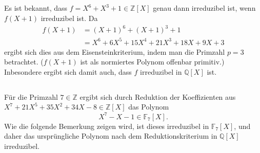 \documentclass[a4paper,10pt]{article}
\theoremstyle{definition}
\newcommand{\Z}{\mathbb{Z}}
\newcommand{\Q}{\mathbb{Q}}
\newcommand{\F}{\mathbb{F}}
\begin{document}
\subsection{}
Es ist bekannt, dass $f = X^6+X^3+1 \in \Z[X]$ genau dann irreduzibel ist, wenn $f(X+1)$ irreduzibel ist. Da
\begin{align*}
 f(X+1) &= (X+1)^6+(X+1)^3+1 \\
        &= X^6 + 6X^5 + 15X^4 + 21X^3 + 18X + 9X + 3
\end{align*}
ergibt sich dies aus dem Eisensteinkriterium, indem man die Primzahl $p = 3$ betrachtet. ($f(X+1)$ ist als normiertes Polynom offenbar primitiv.) Inbesondere ergibt sich damit auch, dass $f$ irreduzibel in $\Q[X]$ ist.


\subsection{}
Für die Primzahl $7 \in \Z$ ergibt sich durch Reduktion der Koeffizienten aus $X^7 + 21X^5 + 35X^2 +34X -8 \in \Z[X]$ das Polynom
\[
 X^7 -X -1 \in \F_7[X].
\]
Wie die folgende Bemerkung zeigen wird, ist dieses irreduzibel in $\F_7[X]$, und daher das ursprüngliche Polynom nach dem Reduktionskriterium in $\Q[X]$ irreduzibel.
\end{document}

